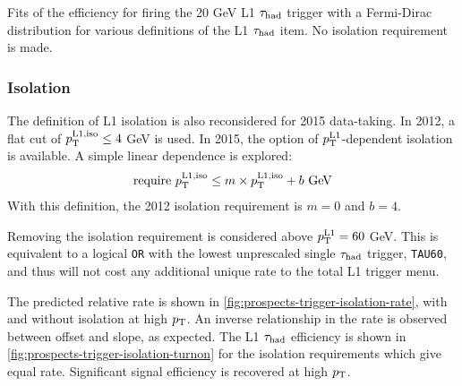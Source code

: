\begin{table}[bp]
  \centering
  \renewcommand{\arraystretch}{1.4}
  \caption{Fits of the efficiency for firing the 20 GeV L1 $\tau_\text{had}$ trigger with a Fermi-Dirac distribution for various definitions of the L1 $\tau_\text{had}$ item. No isolation requirement is made.}
  
  \label{tab:prospects-tausize}
\end{table}

\subsubsection{Isolation}

The definition of L1 isolation is also reconsidered for 2015 data-taking. In 2012, a flat cut of $p_{\mathrm{T}}^\text{L1,iso} \leq 4$ GeV is used. In 2015, the option of $p_{\mathrm{T}}^\text{L1}$-dependent isolation is available. A simple linear dependence is explored:
%
\begin{equation}
  \begin{split}
    \text{require} \ \pt^\text{L1,iso} &\leq m \times \pt^\text{L1,iso} + b \ \text{GeV} \\
   \end{split}
  \label{eqn:prospects-L1iso}
\end{equation}
%
With this definition, the 2012 isolation requirement is $m=0$ and $b=4$.

Removing the isolation requirement is considered above $p_{\mathrm{T}}^\text{L1} = 60$ GeV. This is equivalent to a logical \texttt{OR} with the lowest unprescaled single $\tau_\text{had}$ trigger, \texttt{TAU60}, and thus will not cost any additional unique rate to the total L1 trigger menu.

The predicted relative rate is shown in \cref{fig:prospects-trigger-isolation-rate}, with and without isolation at high $p_{\mathrm{T}}$. An inverse relationship in the rate is observed between offset and slope, as expected. The L1 $\tau_\text{had}$ efficiency is shown in \cref{fig:prospects-trigger-isolation-turnon} for the isolation requirements which give equal rate. Significant signal efficiency is recovered at high $p_{\mathrm{T}}$.

